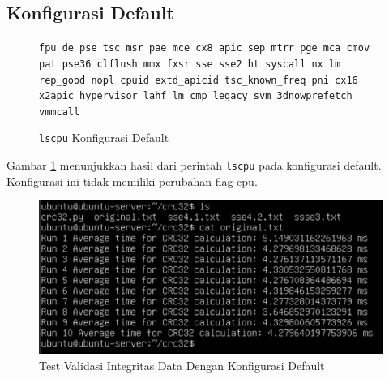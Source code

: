 \subsection{Konfigurasi Default}
\begin{figure}
    \texttt{fpu de pse tsc msr pae mce cx8 apic sep mtrr pge mca cmov pat pse36 clflush mmx fxsr sse sse2 ht syscall nx lm rep\_good nopl cpuid extd\_apicid tsc\_known\_freq pni cx16 x2apic hypervisor lahf\_lm cmp\_legacy svm 3dnowprefetch vmmcall}
    \caption{\texttt{lscpu} Konfigurasi Default}
    \label{fig:lscpu_file_integrity_test_default}
\end{figure}

Gambar \ref{fig:lscpu_file_integrity_test_default} menunjukkan hasil dari perintah \texttt{lscpu} pada konfigurasi default. Konfigurasi ini tidak memiliki perubahan flag cpu.

\begin{figure}
    \centering
    \includegraphics[width=1\textwidth]
    {assets/pics/crc-test/original.jpeg}
    \caption{Test Validasi Integritas Data Dengan Konfigurasi Default}
    \label{fig:file_integrity_test_default}
\end{figure}

